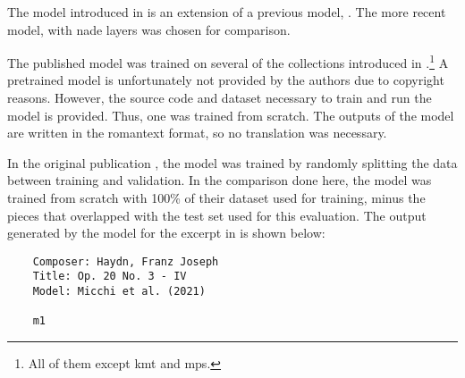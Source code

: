 
The model introduced in \textcite{micchi2021deep} is an
extension of a previous model, \textcite{micchi2020not}. The
more recent model, with \gls{nade} layers was chosen for
comparison.

The published model was trained on several of the
collections introduced in
.\footnote{All of
them except \gls{kmt} and \gls{mps}.} A pretrained model is
unfortunately not provided by the authors due to copyright
reasons. However, the source code and dataset necessary to
train and run the model is provided. Thus, one was trained
from scratch. The outputs of the model are written in the
\gls{romantext} format, so no translation was necessary. 

In the original publication \parencite{micchi2021deep}, the
model was trained by randomly splitting the data between
training and validation. In the comparison done here, the
model was trained from scratch with 100\% of their dataset
used for training, minus the pieces that overlapped with the
test set used for this evaluation. The output generated by
the model for the excerpt in  is shown
below:

\begin{verbatim}
    Composer: Haydn, Franz Joseph
    Title: Op. 20 No. 3 - IV
    Model: Micchi et al. (2021)
    
    m1
\end{verbatim}
